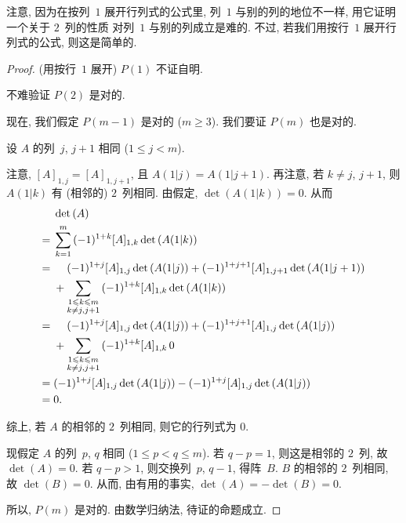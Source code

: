 \documentclass[../libro.tex]{subfiles}
\begin{document}
注意, 因为在按列~\(1\) 展开行列式的公式里,
列~\(1\) 与别的列的地位不一样,
用它证明一个关于 \(2\)~列的性质%
对列~\(1\) 与别的列成立是难的.
不过, 若我们用按行~\(1\) 展开行列式的公式,
则这是简单的.

\begin{proof}
    (用按行~\(1\) 展开)
    \(P(1)\) 不证自明.

    不难验证 \(P(2)\) 是对的.

    现在, 我们假定 \(P(m-1)\) 是对的 (\(m \geq 3\)).
    我们要证 \(P(m)\) 也是对的.

    设 \(A\) 的列~\(j\), \(j+1\) 相同 (\(1 \leq j < m\)).

    注意, \([A]_{1,j} = [A]_{1,j+1}\),
    且 \(A(1|j) = A(1|j+1)\).
    再注意, 若 \(k \neq j\), \(j+1\),
    则 \(A(1|k)\) 有 (相邻的)  \(2\)~列相同.
    由假定, \(\det {(A(1|k))} = 0\).
    从而
    \begin{align*}
        & \det {(A)}
        \\
        = {} &
        \sum_{k = 1}^{m}
        {(-1)^{1 + k} [A]_{1,k} \det {(A(1|k))}}
        \\
        = {} &
        \hphantom{{} + {}}
        (-1)^{1 + j} [A]_{1,j} \det {(A(1|j))}
        + (-1)^{1 + j+1} [A]_{1,j+1} \det {(A(1|j+1))}
        \\
        & +
        \sum_{\substack{1 \leq k \leq m \\ k \neq j, j+1}}
        {(-1)^{1 + k} [A]_{1,k} \det {(A(1|k))}}
        \\
        = {} &
        \hphantom{{} + {}}
        (-1)^{1 + j} [A]_{1,j} \det {(A(1|j))}
        + (-1)^{1 + j+1} [A]_{1,j} \det {(A(1|j))}
        \\
        & +
        \sum_{\substack{1 \leq k \leq m \\ k \neq j, j+1}}
        {(-1)^{1 + k} [A]_{1,k}\,0 }
        \\
        = {} &
        (-1)^{1 + j} [A]_{1,j} \det {(A(1|j))}
        - (-1)^{1 + j} [A]_{1,j} \det {(A(1|j))}
        \\
        = {} & 0.
    \end{align*}

    综上,
    若 \(A\) 的相邻的 \(2\)~列相同,
    则它的行列式为 \(0\).

    现假定 \(A\) 的列~\(p\), \(q\) 相同
    (\(1 \leq p < q \leq m\)).
    若 \(q - p = 1\), 则这是相邻的 \(2\)~列,
    故 \(\det {(A)} = 0\).
    若 \(q - p > 1\), 则交换列~\(p\), \(q-1\),
    得阵~\(B\).
    \(B\) 的相邻的 \(2\)~列相同, 故 \(\det {(B)} = 0\).
    从而, 由有用的事实,
    \(\det {(A)} = -\det {(B)} = 0\).

    所以, \(P(m)\) 是对的.
    由数学归纳法, 待证的命题成立.
\end{proof}
\end{document}
